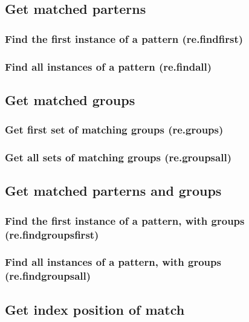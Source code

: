 \documentclass{article}
\theoremstyle{definition}
\begin{document}
\subsection{Get matched parterns}

\subsubsection{Find the first instance of a pattern (re.findfirst)}

\subsubsection{Find all instances of a pattern (re.findall)}

\subsection{Get matched groups}

\subsubsection{Get first set of matching groups (re.groups)}

\subsubsection{Get all sets of matching groups (re.groupsall)}

\subsection{Get matched parterns and groups}

\subsubsection{Find the first instance of a pattern, with groups (re.findgroupsfirst)}

\subsubsection{Find all instances of a pattern, with groups (re.findgroupsall)}

\subsection{Get index position of match}
\end{document}
